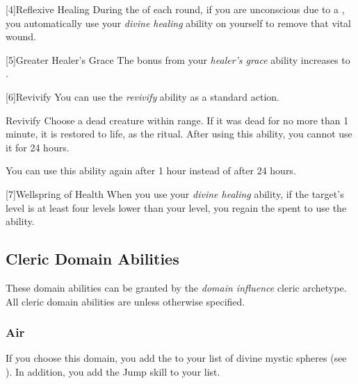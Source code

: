         [4]{Reflexive Healing} During the  of each round, if you are unconscious due to a , you automatically use your \textit{divine healing} ability on yourself to remove that vital wound.

        [5]{Greater Healer's Grace} The bonus from your \textit{healer's grace} ability increases to .

        [6]{Revivify} You can use the \textit{revivify} ability as a standard action.
        \begin{apability}{Revivify}
            Choose a dead creature within \rngclose range.
            If it was dead for no more than 1 minute, it is restored to life, as the  ritual.
            After using this ability, you cannot use it for 24 hours.

            \rankline
             You can use this ability again after 1 hour instead of after 24 hours.
        \end{apability}

        [7]{Wellspring of Health} When you use your \textit{divine healing} ability,
            if the target's level is at least four levels lower than your level,
            you regain the  spent to use the ability.

    \subsection{Cleric Domain Abilities}\label{Cleric Domain Abilities}
        These domain abilities can be granted by the \textit{domain influence} cleric archetype.
        All cleric domain abilities are  unless otherwise specified.

        \subsubsection{Air}
            If you choose this domain, you add the   to your list of divine mystic spheres (see ).
            In addition, you add the Jump skill to your  list.

